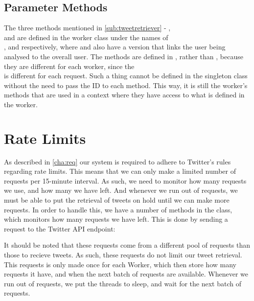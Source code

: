 \subsection{Parameter Methods}
The three methods mentioned in \autoref{sub:tweetretriever} -
,  \\and {} are defined in
the worker class under the names of \\,
 and  respectively, where
 and  also have a version
that links the user being analysed to the overall user. The methods are defined
in , rather than , because they are
different for each worker, since the \\ is different for
each request. Such a thing cannot be defined in the singleton class without the need
to pass the ID to each method. This way, it is still the worker's methods that
are used in a context where they have access to what is defined in the worker.

\section{Rate Limits}\label{sec:rateLimit}
As described in \autoref{cha:req} our system is required to adhere to Twitter's
rules regarding rate limits. This means that we can only make a limited number of
requests per 15-minute interval. As such, we need to monitor how many requests
we use, and how many we have left. And whenever we run out of requests, we must
be able to put the retrieval of tweets on hold until we can make more requests.
In order to handle this, we have a number of methods in the 
class, which monitors how many requests we have left. This is done by sending a
request to the Twitter \ac{API} endpoint: \nl

 \nl

It should be noted that these requests come from a different pool of requests
than those to recieve tweets. As such, these requests do not limit our tweet
retrieval. This requests is only made once for each Worker, which then store how
many requests it have, and when the next batch of requests are available.
Whenever we run out of requests, we put the threads to sleep, and wait for the
next batch of requests.











